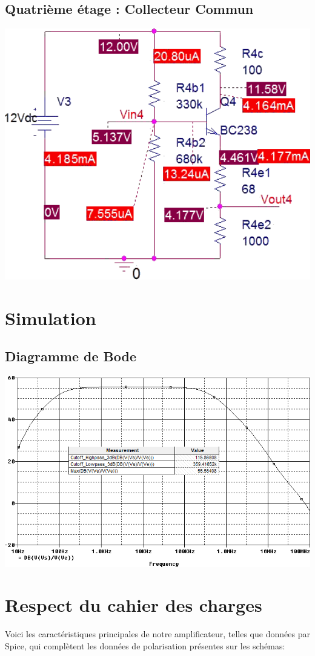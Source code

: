    \subsection{Quatrième étage : Collecteur Commun}
    \includegraphics[width=17cm]{images/4}

  \section{Simulation}
   \subsection{Diagramme de Bode}
    \includegraphics[width=17cm]{images/bode}

  \section{Respect du cahier des charges}
   Voici les caractéristiques principales de notre amplificateur, telles que données par
   Spice, qui complètent les données de polarisation présentes sur les schémas:

